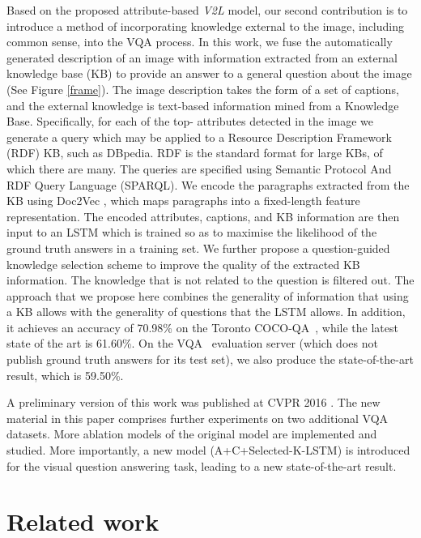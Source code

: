 \documentclass[10pt,journal,compsoc]{IEEEtran}
\def\V2L{\textit{V2L}}
\begin{document}
Based on the proposed attribute-based \textit{\V2L} model,
our second contribution is to introduce 
a method of incorporating knowledge external to the image, including common sense, into the VQA process.
In this work, we fuse the automatically generated description of an image with information extracted from an external
knowledge base (KB) to provide an answer to a general question about the image (See Figure \ref{frame}). The image description takes the form of a set of captions, and the external knowledge is text-based information mined from a Knowledge Base. Specifically, for each of the top- attributes detected in the image we generate a query which may be applied to a Resource Description Framework (RDF) KB, such as DBpedia.  RDF is the standard format for large KBs, of which there are many.  The queries are specified using Semantic Protocol And RDF Query Language (SPARQL). We encode the paragraphs extracted from the KB using Doc2Vec \cite{le2014distributed}, which maps paragraphs into a fixed-length feature representation. The encoded attributes, captions, and KB information are then input to an LSTM which is trained so as to maximise the likelihood of the ground truth answers in a training set. We further propose a question-guided knowledge selection scheme to improve the quality of  the extracted KB information. The knowledge that is
not related to the question is filtered out. The approach that we propose here combines the generality of information that using a KB allows with the generality of questions that the LSTM allows.
In addition, it achieves an accuracy of 70.98\% on the Toronto COCO-QA~\cite{ren2015image}, while the latest state of the art is 61.60\%. On the VQA~\cite{antol2015vqa} evaluation server (which does not publish ground truth answers for its test set), we also produce the state-of-the-art result, which is 59.50\%.

A preliminary version of this work was published at CVPR 2016 \cite{wu2015image,wu2015ask}. The new material in this paper comprises further experiments on two additional VQA datasets. More ablation models of the original model are implemented and studied. More importantly, a new model (A+C+Selected-K-LSTM) 
is introduced 
for the visual question answering task, leading to a new state-of-the-art result.




 
\section{Related work}
\label{sec:related_work}
\end{document}
